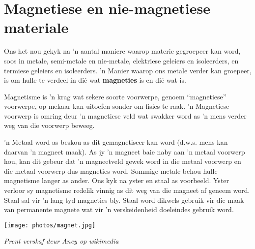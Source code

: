             \section{Magnetiese en nie-magnetiese materiale}
            \nopagebreak
      \label{m38706*id67151}Ons het nou gekyk na 'n aantal maniere waarop materie gegroepeer kan word, soos in metale, semi-metale en nie-metale, elektriese geleiers en isoleerders, en termiese geleiers en isoleerders. 'n Manier waarop ons metale verder kan groepeer, is om hulle te verdeel in di\'e wat \textbf{magneties} is en di\'e wat  is.\par 
\par
\Definition{   \label{id2410309} { Magnetisme }} { \label{m38706*meaningfhsst!!!underscore!!!id570}
      \label{m38706*id67174}       Magnetisme is 'n krag wat sekere soorte voorwerpe, genoem ``magnetiese'' voorwerpe, op mekaar kan uitoefen sonder om fisies te raak. 'n Magnetiese voorwerp is omring deur 'n magnetiese veld wat swakker word as 'n mens verder weg van die voorwerp beweeg.\par 
       } 
\begin{minipage}{.5\textwidth}
      \label{m38706*id67186} 'n Metaal word as  beskou as dit gemagnetiseer kan word (d.w.s. mens kan daarvan 'n magneet maak). As jy 'n magneet baie naby aan 'n metaal voorwerp hou, kan dit gebeur dat 'n magneetveld gewek word in die metaal voorwerp en die metaal voorwerp dus magneties word. Sommige metale behou hulle magnetisme langer as ander. Ons kyk na yster en staal as voorbeeld. Yster verloor sy magnetisme redelik vinnig as dit weg van die magneet af geneem word. Staal sal vir 'n lang tyd magneties bly. Staal word dikwels gebruik vir die maak van permanente magnete wat vir 'n verskeidenheid doeleindes gebruik word.\par 
\end{minipage}
\begin{minipage}{.5\textwidth}
\begin{center}
 \texttt{[image: photos/magnet.jpg]}\par
\textit{Prent verskaf deur Aney op wikimedia}
\end{center}
\end{minipage}
